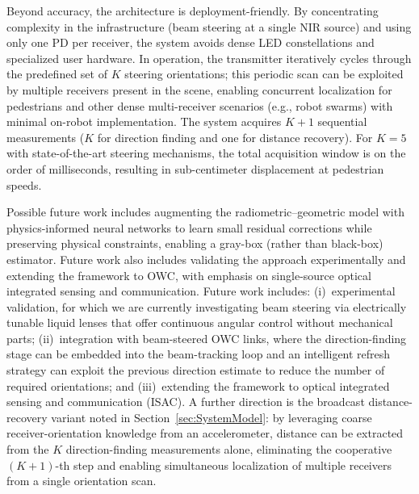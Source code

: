 \documentclass[journal]{IEEEtran}
\newcommand{\added}[1]{{\color{blue}#1}}
\newcommand{\deleted}[1]{{\color{red}#1}}
\newcommand{\addedlate}[1]{{\color{violet}#1}}
\begin{document}
Beyond accuracy, the architecture is deployment-friendly. By concentrating complexity in the infrastructure (beam steering at a single NIR source) and using only one PD per receiver, the system avoids dense LED constellations and specialized user hardware. In operation, the transmitter iteratively cycles through the predefined set of \(K\) steering orientations; this periodic scan can be exploited by multiple receivers present in the scene, enabling concurrent localization for pedestrians and other dense multi-receiver scenarios (e.g., robot swarms) with minimal on-robot implementation.
\added{The system acquires $K+1$ sequential measurements ($K$ for direction finding and one for distance recovery). For $K=5$ with state-of-the-art steering mechanisms, the total acquisition window is on the order of milliseconds, resulting in sub-centimeter displacement at pedestrian speeds.}

\deleted{Possible future work includes augmenting the radiometric–geometric model with physics-informed neural networks to learn small residual corrections while preserving physical constraints, enabling a gray-box (rather than black-box) estimator. Future work also includes validating the approach experimentally and extending the framework to OWC, with emphasis on single-source optical integrated sensing and communication.}
\added{Future work includes: (i)~experimental validation, for which we are currently investigating beam steering via electrically tunable liquid lenses that offer continuous angular control without mechanical parts; (ii)~integration with beam-steered OWC links, where the direction-finding stage can be embedded into the beam-tracking loop and an intelligent refresh strategy can exploit the previous direction estimate to reduce the number of required orientations; and (iii)~extending the framework to optical integrated sensing and communication (ISAC).}
\addedlate{A further direction is the broadcast distance-recovery variant noted in Section~\ref{sec:SystemModel}: by leveraging coarse receiver-orientation knowledge from an accelerometer, distance can be extracted from the $K$ direction-finding measurements alone, eliminating the cooperative $(K{+}1)$-th step and enabling simultaneous localization of multiple receivers from a single orientation scan.}

\appendices
\end{document}
